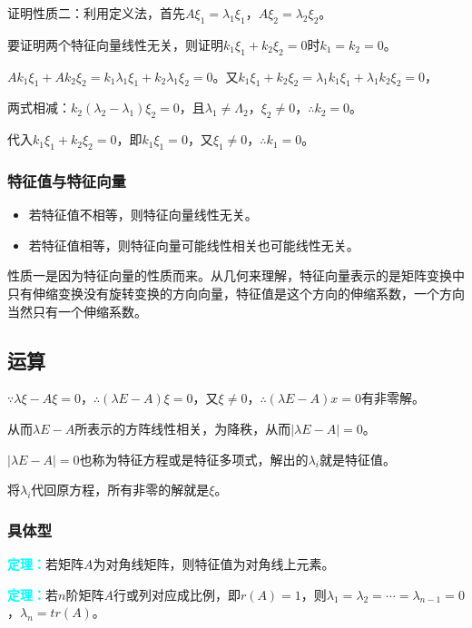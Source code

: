 \documentclass[UTF8, 12pt]{ctexart}
\begin{document}
证明性质二：利用定义法，首先$A\xi_1=\lambda_1\xi_1$，$A\xi_2=\lambda_2\xi_2$。

要证明两个特征向量线性无关，则证明$k_1\xi_1+k_2\xi_2=0$时$k_1=k_2=0$。

$Ak_1\xi_1+Ak_2\xi_2=k_1\lambda_1\xi_1+k_2\lambda_1\xi_2=0$。又$k_1\xi_1+k_2\xi_2=\lambda_1k_1\xi_1+\lambda_1k_2\xi_2=0$，

两式相减：$k_2(\lambda_2-\lambda_1)\xi_2=0$，且$\lambda_1\neq\Lambda_2$，$\xi_2\neq0$，$\therefore k_2=0$。

代入$k_1\xi_1+k_2\xi_2=0$，即$k_1\xi_1=0$，又$\xi_1\neq0$，$\therefore k_1=0$。

\subsubsection{特征值与特征向量}

\begin{itemize}
    \item 若特征值不相等，则特征向量线性无关。
    \item 若特征值相等，则特征向量可能线性相关也可能线性无关。
\end{itemize}

性质一是因为特征向量的性质而来。从几何来理解，特征向量表示的是矩阵变换中只有伸缩变换没有旋转变换的方向向量，特征值是这个方向的伸缩系数，一个方向当然只有一个伸缩系数。

\subsection{运算}

$\because\lambda\xi-A\xi=0$，$\therefore(\lambda E-A)\xi=0$，又$\xi\neq0$，$\therefore(\lambda E-A)x=0$有非零解。

从而$\lambda E-A$所表示的方阵线性相关，为降秩，从而$\vert\lambda E-A\vert=0$。

$\vert\lambda E-A\vert=0$也称为特征方程或是特征多项式，解出的$\lambda_i$就是特征值。

将$\lambda_i$代回原方程，所有非零的解就是$\xi$。

\subsubsection{具体型}

\textcolor{aqua}{\textbf{定理：}}若矩阵$A$为对角线矩阵，则特征值为对角线上元素。

\textcolor{aqua}{\textbf{定理：}}若$n$阶矩阵$A$行或列对应成比例，即$r(A)=1$，则$\lambda_1=\lambda_2=\cdots=\lambda_{n-1}=0$，$\lambda_n=tr(A)$。
\end{document}
